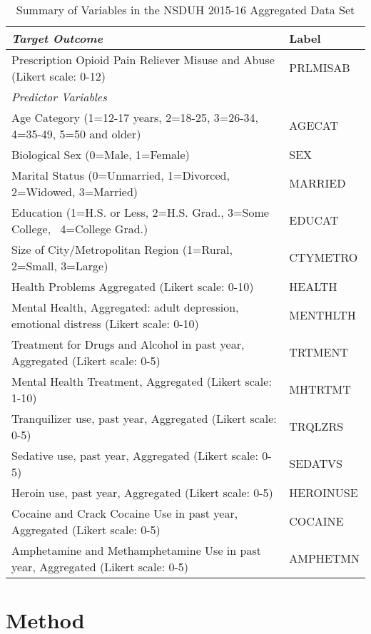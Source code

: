 \\\documentclass[sigconf]{acmart}
\begin{document}
\begin{table*}[ht]
  \caption{Summary of Variables in the NSDUH 2015-16 Aggregated Data Set}
  \label{tab:freq}
  \begin{tabular}{ll}
    \toprule
    \textit{Target Outcome} & Label \\
    \midrule
    Prescription Opioid Pain Reliever Misuse and Abuse (Likert scale: 0-12)& PRLMISAB  \\
    \midrule
    \textit{Predictor Variables}&   \\
    \midrule
    Age Category (1=12-17 years, 2=18-25, 3=26-34, 4=35-49, 5=50 and older)& AGECAT \\
    Biological Sex (0=Male, 1=Female)& SEX  \\
    Marital Status (0=Unmarried, 1=Divorced, 2=Widowed, 3=Married)& MARRIED  \\
    Education (1=H.S. or Less, 2=H.S. Grad., 3=Some College,  4=College Grad.)& EDUCAT  \\
    Size of City/Metropolitan Region (1=Rural, 2=Small, 3=Large)& CTYMETRO  \\
    Health Problems Aggregated  (Likert scale: 0-10)& HEALTH  \\
    Mental Health, Aggregated: adult depression, emotional distress (Likert scale: 0-10)& MENTHLTH  \\
    Treatment for Drugs and Alcohol in past year, Aggregated (Likert scale: 0-5)& TRTMENT  \\
    Mental Health Treatment, Aggregated (Likert scale: 1-10)& MHTRTMT  \\
    Tranquilizer use, past year, Aggregated (Likert scale: 0-5)& TRQLZRS \\
    Sedative use, past year, Aggregated (Likert scale: 0-5)& SEDATVS  \\
    Heroin use, past year, Aggregated (Likert scale: 0-5)& HEROINUSE  \\
    Cocaine and Crack Cocaine Use in past year, Aggregated  (Likert scale: 0-5)& COCAINE  \\
    Amphetamine and Methamphetamine Use in past year, Aggregated (Likert scale: 0-5)& AMPHETMN  \\
    \bottomrule
  \end{tabular}
\end{table*}



\section{Method}
\end{document}
